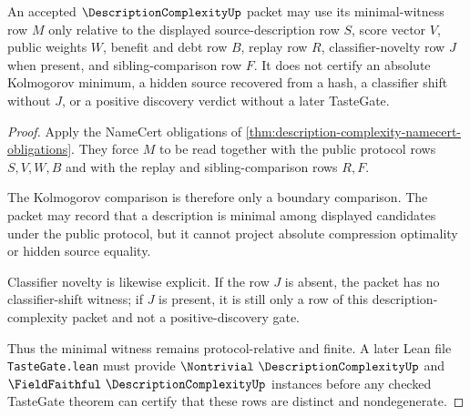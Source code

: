 \begin{theorem}
\label{thm:description-complexity-minimal-witness-boundary}
An accepted $\DescriptionComplexityUp$ packet may use its minimal-witness row $M$ only relative to the displayed source-description row $S$, score vector $V$, public weights $W$, benefit and debt row $B$, replay row $R$, classifier-novelty row $J$ when present, and sibling-comparison row $F$. It does not certify an absolute Kolmogorov minimum, a hidden source recovered from a hash, a classifier shift without $J$, or a positive discovery verdict without a later TasteGate.
\end{theorem}
\begin{proof}
Apply the NameCert obligations of \autoref{thm:description-complexity-namecert-obligations}. They force $M$ to be read together with the public protocol rows $S,V,W,B$ and with the replay and sibling-comparison rows $R,F$.

The Kolmogorov comparison is therefore only a boundary comparison. The packet may record that a description is minimal among displayed candidates under the public protocol, but it cannot project absolute compression optimality or hidden source equality.

Classifier novelty is likewise explicit. If the row $J$ is absent, the packet has no classifier-shift witness; if $J$ is present, it is still only a row of this description-complexity packet and not a positive-discovery gate.

Thus the minimal witness remains protocol-relative and finite. A later Lean file \texttt{TasteGate.lean} must provide $\Nontrivial\ \DescriptionComplexityUp$ and $\FieldFaithful\ \DescriptionComplexityUp$ instances before any checked TasteGate theorem can certify that these rows are distinct and nondegenerate.
\end{proof}




